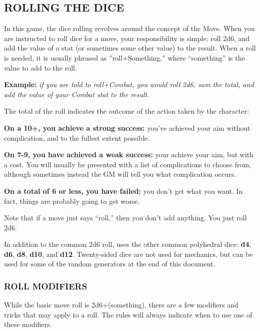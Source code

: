 \documentclass[oneside,10pt]{article}
\begin{document}
\begin{multicols}{2}
\subsection{ROLLING THE DICE}
In this game, the dice rolling revolves around the concept of
the Move. When you are instructed to roll dice for a move,
your responsibility is simple: roll 2d6, and add the value of
a stat (or sometimes some other value) to the result. When
a roll is needed, it is usually phrased as ”roll+Something,”
where “something” is the value to add to the roll.

\vspace{.1cm}
\begin{adjustwidth*}{.5cm}{.5cm}
\textbf{Example:} \textit{if you are told to roll+Combat, you would roll
2d6, sum the total, and add the value of your Combat stat
to the result.}
\end{adjustwidth*}
\vspace{.1cm}

The total of the roll indicates the outcome of the action taken
by the character:

\begin{adjustwidth*}{.5cm}{.5cm}
\textbf{On a 10+, you achieve a strong success:} you’ve achieved
your aim without complication, and to the fullest extent
possible.

\textbf{On 7-9, you have achieved a weak success:} your achieve
your aim, but with a cost. You will usually be presented with a list of complications to choose from, although
sometimes instead the GM will tell you what complication
occurs.

\textbf{On a total of 6 or less, you have failed:} you don’t get
what you want. In fact, things are probably going to get
worse.
\end{adjustwidth*}

Note that if a move just says “roll,” then you don’t add anything. You just roll 2d6.

In addition to the common 2d6 roll, \SW{}  uses the 
other common polyhedral dice: \textbf{d4}, \textbf{d6}, \textbf{d8}, \textbf{d10}, and \textbf{d12}. 
Twenty-sided dice are not used for mechanics, but can be 
used for some of the random generators at the end of this 
document. 

\subsubsection{ROLL MODIFIERS }
While the basic move roll is 2d6+(something), there are a few 
modifiers and tricks that may apply to a roll. The rules will 
always indicate when to use one of these
modifiers. 


\end{multicols}
\end{document}

